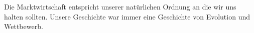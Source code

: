 Die Marktwirtschaft entspricht unserer natürlichen Ordnung an die wir uns halten sollten.
Unsere Geschichte war immer eine Geschichte von Evolution und Wettbewerb.